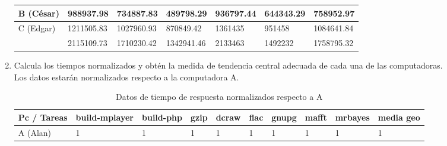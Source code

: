 \documentclass{article}
\begin{document}
\begin{enumerate}
{\begin{itemize}
{\begin{table}[H]
\begin{tabular}{|l|l|l|l|l|l|l|}
                            \cellcolor[HTML]{FFFE65}{\color[HTML]{000000}}
                            B (César) & 988937.98 & 734887.83 & 489798.29 
                            & 936797.44 & 644343.29 & 758952.97\\ \hline
            
                            \cellcolor[HTML]{34FF34}{\color[HTML]{000000}} 
                            C (Edgar) & 1211505.83 & 1027960.93 & 870849.42 
                            & 1361435 & 951458 & 1084641.84\\ \hline
            
                            \cellcolor[HTML]{9698ED}{\color[HTML]{000000} 
                            D(Sandra)} & 2115109.73 & 1710230.42 & 1342941.46 
                            & 2133463 & 1492232 & 1758795.32 \\ \hline
                        \end{tabular}
                    \end{table} 
                }
            \end{itemize}
            
        }
        \item {
            Calcula los tiempos normalizados y obtén la medida de tendencia 
            central adecuada de cada una de las computadoras. \\
            Los datos estarán normalizados respecto a la computadora A.

            \begin{table}[H]
                \caption*{Datos de tiempo de respuesta normalizados respecto a A}
                \begin{tabular}{|l|l|l|l|l|l|l|l|l|l|}
                \toprule
                Pc / Tareas 
                & \cellcolor[HTML]{DAE8FC}build-mplayer 
                & \cellcolor[HTML]{DAE8FC}build-php 
                & \cellcolor[HTML]{DAE8FC}gzip 
                & \cellcolor[HTML]{DAE8FC}dcraw  
                & \cellcolor[HTML]{DAE8FC}flac 
                & \cellcolor[HTML]{DAE8FC}gnupg 
                & \cellcolor[HTML]{DAE8FC}mafft 
                & \cellcolor[HTML]{DAE8FC}mrbayes 
                & \cellcolor[HTML]{DAE8FC}media geo \\ \hline
    
                \cellcolor[HTML]{F8A102}{\color[HTML]{000000}} 
                A (Alan) & 1 & 1 & 1 & 1 & 1 & 1 & 1 & 1 & 1 \\ \hline
    

\end{tabular}
\end{table}}
\end{enumerate}
\end{document}
